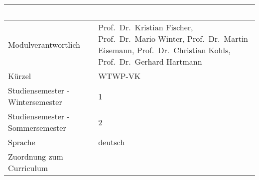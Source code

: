 \begin{longtable}[]{@{}ll@{}}
\toprule
\begin{minipage}[b]{0.12\columnwidth}\raggedright\strut
~\strut
\end{minipage} & \begin{minipage}[b]{0.12\columnwidth}\raggedright\strut
~\strut
\end{minipage}\tabularnewline
\midrule
\endhead
\begin{minipage}[t]{0.12\columnwidth}\raggedright\strut
Modulverantwortlich\strut
\end{minipage} & \begin{minipage}[t]{0.12\columnwidth}\raggedright\strut
Prof.~Dr.~Kristian Fischer, Prof.~Dr.~Mario Winter, Prof.~Dr.~Martin
Eisemann, Prof.~Dr.~Christian Kohls, Prof.~Dr.~Gerhard Hartmann\strut
\end{minipage}\tabularnewline
\begin{minipage}[t]{0.12\columnwidth}\raggedright\strut
Kürzel\strut
\end{minipage} & \begin{minipage}[t]{0.12\columnwidth}\raggedright\strut
WTWP-VK\strut
\end{minipage}\tabularnewline
\begin{minipage}[t]{0.12\columnwidth}\raggedright\strut
Studiensemester - Wintersemester\strut
\end{minipage} & \begin{minipage}[t]{0.12\columnwidth}\raggedright\strut
1\strut
\end{minipage}\tabularnewline
\begin{minipage}[t]{0.12\columnwidth}\raggedright\strut
Studiensemester - Sommersemester\strut
\end{minipage} & \begin{minipage}[t]{0.12\columnwidth}\raggedright\strut
2\strut
\end{minipage}\tabularnewline
\begin{minipage}[t]{0.12\columnwidth}\raggedright\strut
Sprache\strut
\end{minipage} & \begin{minipage}[t]{0.12\columnwidth}\raggedright\strut
deutsch\strut
\end{minipage}\tabularnewline
\begin{minipage}[t]{0.12\columnwidth}\raggedright\strut
Zuordnung zum Curriculum\strut
\end{minipage} & \begin{minipage}[t]{0.12\columnwidth}\raggedright\strut

\end{minipage}
\end{longtable}
